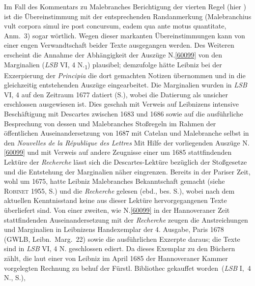 \begin{ledgroup}
Im Fall des Kommentars zu Malebranches Berichtigung der vierten Regel (hier ) ist die Übereinstimmung mit der entsprechenden Randanmerkung (\glqq Malebranchius vult corpora simul ire post concursum, eadem qua ante motus quantitate\grqq, Anm.~3) sogar wörtlich.
Wegen dieser markanten Übereinstimmungen kann von einer engen Verwandtschaft beider Texte ausgegangen werden.
Des Weiteren erscheint die Annahme der Abhängigkeit der Auszüge N.\;\ref{60099} von den Marginalien (\cite{01301}\textit{LSB} VI, 4 N.\textsubscript{1}) plausibel;
demzufolge hätte Leibniz bei der Exzerpierung der \cite{00035}\textit{Principia} die dort gemachten Notizen übernommen und in die gleichzeitig entstehenden Auszüge eingearbeitet.
\pend
\pstart
Die Marginalien wurden in \textit{LSB} VI, 4 auf den Zeitraum 1677 datiert (S.),
wobei die Datierung als unsicher erschlossen ausgewiesen ist.
Dies geschah mit Verweis auf Leibnizens intensive Beschäftigung mit Descartes zwischen 1683 und 1686
sowie auf die ausführliche Besprechung von dessen und Malebranches Stoßregeln 
im Rahmen der öffentlichen Auseinandersetzung von 1687 mit
Catelan 
und Malebranche selbst
in den \cite{02002}\textit{Nouvelles de la République des Lettres}
Mit Hilfe der vorliegenden Auszüge N.\;\ref{60099} und mit Verweis auf andere Zeugnisse einer um 1685 stattfindenden Lektüre der \cite{02080}\textit{Recherche}
lässt sich die Descartes-Lektüre bezüglich der Stoßgesetze und die Entstehung der Marginalien näher eingrenzen.
\pend
\pstart
Bereits in der Pariser Zeit, wohl um 1675, hatte Leibniz Malebranches Bekanntschaft gemacht
(siehe \cite{02078}\textsc{Robinet} 1955, S.)
und die \cite{02080}\textit{Recherche} gelesen
(\cite{02078}ebd., bes. S.), 
wobei nach dem aktuellen Kenntnisstand keine aus dieser Lektüre hervorgegangenen Texte überliefert sind.
Von einer zweiten, wie N.\;\ref{60099} in der Hannoveraner Zeit stattfindenden
Auseinandersetzung mit der \textit{Recherche} zeugen die
Anstreichungen und Marginalien in Leibnizens
\cite{02081}Handexemplar der 4. Ausgabe, Paris 1678
(\cite{02081}GWLB, Leibn.~Marg.~22)
sowie die ausführlichen Exzerpte daraus; 
die Texte sind in \cite{02082}\textit{LSB} VI, 4 N. geschlossen ediert.
Da dieses Exemplar zu den Büchern zählt, die laut einer 
von Leibniz im April 1685 der Hannoveraner Kammer vorgelegten
\cite{02083}Rechnung \glqq zu behuf der Fürstl. Bibliothec gekauffet worden\grqq\ (\textit{LSB} I,~4 N., S.),

\end{ledgroup}
